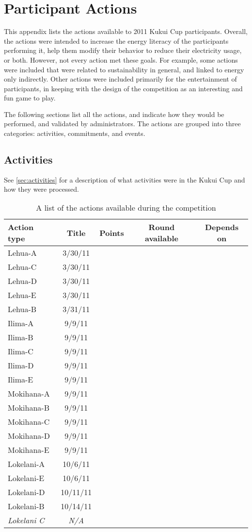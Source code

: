 \chapter{Participant Actions}
\label{app:actions}

This appendix lists the actions available to 2011 Kukui Cup participants. Overall, the actions were intended to increase the energy literacy of the participants performing it, help them modify their behavior to reduce their electricity usage, or both. However, not every action met these goals. For example, some actions were included that were related to sustainability in general, and linked to energy only indirectly. Other actions were included primarily for the entertainment of participants, in keeping with the design of the competition as an interesting and fun game to play.

The following sections list all the actions, and indicate how they would be performed, and validated by administrators. The actions are grouped into three categories: activities, commitments, and events.


\section{Activities}

See \autoref{sec:activities} for a description of what activities were in the Kukui Cup and how they were processed.

\begin{table}[htbp]
	\centering
		\begin{tabular}{| l | c | c | c | c |}
			\hline
			Action type & Title & Points & Round available & Depends on \tabularnewline \hline \hline
			Lehua-A & 3/30/11 \\
			Lehua-C & 3/30/11 \\
			Lehua-D & 3/30/11 \\
			Lehua-E & 3/30/11 \\
			Lehua-B & 3/31/11 \\
			Ilima-A & 9/9/11 \\
			Ilima-B & 9/9/11 \\
			Ilima-C & 9/9/11 \\
			Ilima-D & 9/9/11 \\
			Ilima-E & 9/9/11 \\
			Mokihana-A & 9/9/11 \\
			Mokihana-B & 9/9/11 \\
			Mokihana-C & 9/9/11 \\
			Mokihana-D & 9/9/11 \\
			Mokihana-E & 9/9/11 \\
			Lokelani-A & 10/6/11 \\
			Lokelani-E & 10/6/11 \\
			Lokelani-D & 10/11/11 \\
			Lokelani-B & 10/14/11 \\
			\emph{Lokelani C} & \emph{N/A} \\ \hline
		\end{tabular}
	\caption{A list of the actions available during the competition}
\label{tab:action-list}
\end{table}



